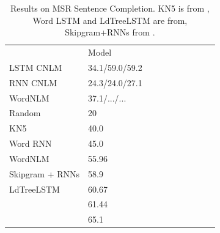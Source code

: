 \begin{table}[t]
  \begin{center}
    \begin{tabular}{l|l|l|l|llllll}
      \multicolumn{1}{c}{}& Model \\
LSTM CNLM	    &      34.1/59.0/59.2 \\
	    RNN CNLM &     24.3/24.0/27.1 \\
	    WordNLM & 37.1/.../... \\ \hline
	    Random & 20 \\
	    KN5   & 40.0 \\
            Word RNN & 45.0 \\
	    WordNLM  & 55.96 \\
Skipgram + RNNs  & 58.9 \\
LdTreeLSTM  & 60.67 \\
            \citet{woods2016exploiting} &  61.44 \\
\citet{melamud2016context2vec} & 65.1 \\
    \end{tabular}
  \end{center}
  \caption{\label{tab:msr-completion-results} Results on MSR Sentence Completion. KN5 is from \cite{Mikolov:2012}, Word LSTM and LdTreeLSTM are from\cite{zhang2016top}, Skipgram+RNNs from \cite{Mikolov:etal:2013b}.}
\end{table}




